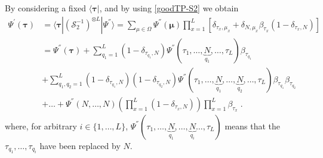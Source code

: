 \documentclass[10pt]{article}
\numberwithin{equation}{section}
\numberwithin{equation}{subsection}
\newcommand{\dt}{\;.}
\begin{document}
 By considering a fixed $\langle\bm{\tau}|$, and by using \eqref{goodTP-S2} we obtain 
\begin{equation}\label{ABS_intermediate}
	\begin{split}
		\Psi^{'}(\bm{\tau})&=\langle \bm{\tau}|(\mathcal{S}_{2}^{-1})^{\otimes L}|\Psi^{''}\rangle=\sum_{\mu\in \Omega}\Psi^{''}(\bm{\mu})\prod_{x=1}^L\left[ \delta_{\tau_x,\mu_x}+\delta_{N,\mu_x}\beta_{\tau_x} (1-\delta_{\tau_x,N})\right]\\&= \Psi^{''}(\bm{\tau})+\sum_{q_{1}= 1}^{L}(1-\delta_{\tau_{q_{1}},N})\Psi^{''}(\tau_{1},\ldots,\underbrace{N}_{q_{1}},\ldots,\tau_{L})\beta_{\tau_{q_{1}}}\\&+
		\sum_{q_{1},q_{2}= 1}^{L}(1-\delta_{\tau_{q_{1}},N})(1-\delta_{\tau_{q_{2}},N})\Psi^{''}(\tau_{1},\ldots,\underbrace{N}_{q_{1}},\ldots,\underbrace{N}_{q_{2}},\ldots,\tau_{L})\beta_{\tau_{q_{1}}}\beta_{\tau_{q_{2}}}\\&+\ldots+\Psi^{''}(N,\ldots,N)\left(\prod_{x=1}^{L}(1-\delta_{\tau_{x},N})\right)\prod_{x=1}^{L}\beta_{\tau_{x}}\dt%
	\end{split}
\end{equation}
where, for arbitrary $i\in\{1,\ldots,L\}$,  $\Psi^{''}(\tau_{1},\ldots,\underbrace{N}_{q_{1}},\ldots,\underbrace{N}_{q_{i}}\ldots,\tau_{L})$ means that the $\tau_{q_{1}},\ldots,\tau_{q_{i}}$ have been replaced by $N$. \\
\end{document}
